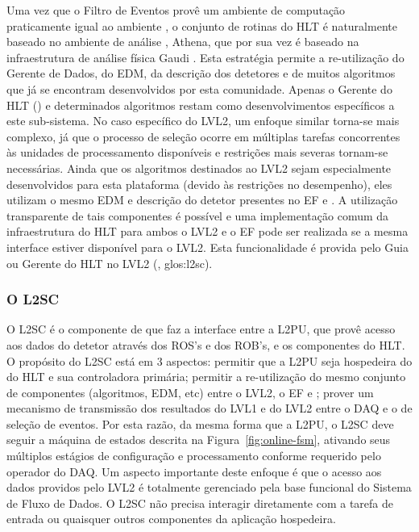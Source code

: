Uma vez que o Filtro de Eventos provê um ambiente de computação praticamente
igual ao ambiente , o conjunto de rotinas do HLT é naturalmente
baseado no ambiente de análise , Athena, que por sua vez é
baseado na infraestrutura de análise física Gaudi \cite{athena:home-page,
athena:devel-guide}. Esta estratégia permite a re-utilização do Gerente de
Dados, do EDM, da descrição dos detetores e de muitos algoritmos que já se
encontram desenvolvidos por esta comunidade. Apenas o Gerente do HLT
() e determinados algoritmos restam como desenvolvimentos
específicos a este sub-sistema. No caso específico do LVL2, um enfoque similar
torna-se mais complexo, já que o processo de seleção ocorre em múltiplas
tarefas concorrentes às unidades de processamento disponíveis e restrições
mais severas tornam-se necessárias. Ainda que os algoritmos destinados ao LVL2
sejam especialmente desenvolvidos para esta plataforma (devido às restrições
no desempenho), eles utilizam o mesmo EDM e descrição do detetor presentes no
EF e . A utilização transparente de tais componentes é possível e
uma implementação comum da infraestrutura do HLT para ambos o LVL2 e o EF pode
ser realizada se a mesma interface estiver disponível para o LVL2. Esta
funcionalidade é provida pelo Guia ou Gerente do HLT no LVL2 (, \gls{glos:l2sc}).

\subsubsection{O L2SC}

O L2SC é o componente de  que faz a interface entre a L2PU, que
provê acesso aos dados do detetor através dos ROS's e dos ROB's, e os
componentes do HLT. O propósito do L2SC está em 3 aspectos: permitir que a
L2PU seja hospedeira do  do HLT e sua controladora primária;
permitir a re-utilização do mesmo conjunto de componentes (algoritmos, EDM,
etc) entre o LVL2, o EF e ; prover um mecanismo de transmissão
dos resultados do LVL1 e do LVL2 entre o DAQ e o  de seleção de
eventos. Por esta razão, da mesma forma que a L2PU, o L2SC deve seguir a
máquina de estados descrita na Figura~\ref{fig:online-fsm}, ativando seus
múltiplos estágios de configuração e processamento conforme requerido pelo
operador do DAQ. Um aspecto importante deste enfoque é que o acesso aos dados
providos pelo LVL2 é totalmente gerenciado pela base funcional do Sistema de
Fluxo de Dados. O L2SC não precisa interagir diretamente com a tarefa de
entrada ou quaisquer outros componentes da aplicação hospedeira.

